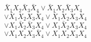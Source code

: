 \documentclass[preview]{standalone}
\begin{document}
\begin{center}
${\bar X_{1} X_{2} \bar X_{3} \bar X_{4} \lor \bar X_{1} X_{2} \bar X_{3} X_{4}}$ \\ ${\lor \bar X_{1} X_{2} X_{3} \bar X_{4} \lor \bar X_{1} X_{2} X_{3} X_{4}}$ \\ ${\lor X_{1} \bar X_{2} \bar X_{3} X_{4} \lor X_{1} \bar X_{2} X_{3} X_{4}}$ \\ $\lor {X_{1} X_{2} X_{3} \bar X_{4} \lor X_{1} X_{2} X_{3} X_{4}}$
\end{center}
\end{document}
